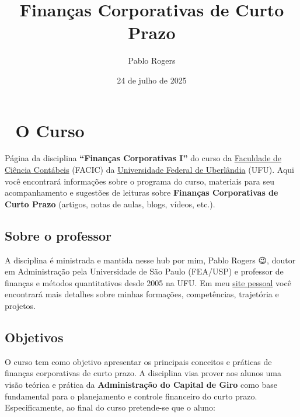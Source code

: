 \documentclass[
  a4paper,
]{book}
\title{Finanças Corporativas de Curto Prazo}
\author{Pablo Rogers}
\date{24 de julho de 2025}
\renewcommand*\contentsname{Índice}
\newcommand\contentsname{Índice}
\begin{document}
\frontmatter
\maketitle

\renewcommand*\contentsname{Índice}
{
\hypersetup{linkcolor=}
\setcounter{tocdepth}{2}
\tableofcontents
}

\mainmatter
{}

\chapter*{🏢 O Curso}\label{sec-home}


Página da disciplina \textbf{``Finanças Corporativas I''} do curso da
\href{https://www.facic.ufu.br/}{Faculdade de Ciência Contábeis} (FACIC)
da \href{https://ufu.br/}{Universidade Federal de Uberlândia} (UFU).
Aqui você encontrará informações sobre o programa do curso, materiais
para seu acompanhamento e sugestões de leituras sobre \textbf{Finanças
Corporativas de Curto Prazo} (artigos, notas de aulas, blogs, vídeos,
etc.).

\section*{Sobre o professor}\label{sec-instrutor}


A disciplina é ministrada e mantida nesse hub por mim, Pablo Rogers 😉,
doutor em Administração pela Universidade de São Paulo (FEA/USP) e
professor de finanças e métodos quantitativos desde 2005 na UFU. Em meu
\href{https://phdpablo.com/}{site pessoal} você encontrará mais detalhes
sobre minhas formações, competências, trajetória e projetos.

\section*{Objetivos}\label{sec-about}


O curso tem como objetivo apresentar os principais conceitos e práticas
de finanças corporativas de curto prazo. A disciplina visa prover aos
alunos uma visão teórica e prática da \textbf{Administração do Capital
de Giro} como base fundamental para o planejamento e controle financeiro
do curto prazo. Especificamente, ao final do curso pretende-se que o
aluno:
\end{document}

